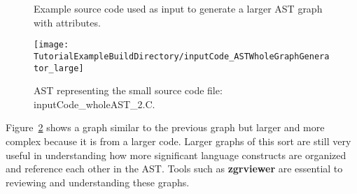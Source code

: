 \begin{figure}[!h]
{\indent
{\mySmallFontSize

\begin{latexonly}
   
\end{latexonly}

\begin{htmlonly}
   
\end{htmlonly}

}
}
\caption{Example source code used as input to generate a larger AST graph with attributes.}
\label{Tutorial:exampleInputCode_ASTGraphGenerator_large}
\end{figure}

\begin{figure}
\texttt{[image: \\TutorialExampleBuildDirectory/inputCode\_ASTWholeGraphGenerator\_large]}
\caption{AST representing the small source code file: inputCode\_wholeAST\_2.C.}
\label{tutorial:exampleOutputCodeWholeGraph_large}
\end{figure}

   Figure~\ref{tutorial:exampleOutputCodeWholeGraph_large} shows a graph similar to the
previous graph but larger and more complex because it is from a larger code. Larger
graphs of this sort are still very useful in understanding how more significant
language constructs are organized and reference each other in the AST.  Tools
such as {\bf zgrviewer} are essential to reviewing and understanding these
graphs.

